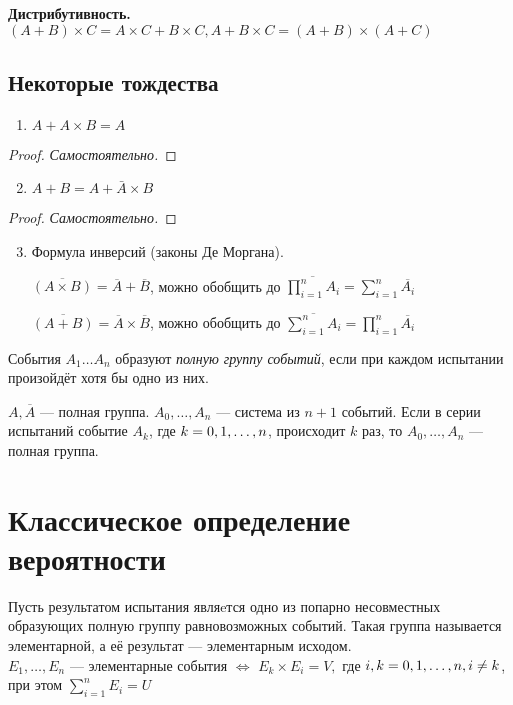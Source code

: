 \textbf{Дистрибутивность.} $(A + B)\times C = A\times C + B\times C,  A + B\times C = (A + B)\times (A + C)$

\subsection{Некоторые тождества}
\begin{enumerate}
	\item $A + A\times B = A$
\end{enumerate}
\begin{proof}
	\textit{Самостоятельно.}
\end{proof}

\begin{enumerate}
	\setcounter{enumi}{1}
	\item{$A + B = A + \bar{A}\times B$}
\end{enumerate}
\begin{proof}
	\textit{Самостоятельно.}
\end{proof}

\begin{enumerate}
	\setcounter{enumi}{2}
	\item Формула инверсий (законы Де Моргана).
	      \smallskip

	      $\overline{(A\times B)} = \overline{A} + \overline{B}$, можно обобщить до $\overline{\prod\limits_{i=1}^n A_i} = \sum\limits_{i=1}^n \overline{A_i} $

	      $\overline{(A + B)} = \overline{A}\times \overline{B}$, можно обобщить до $\overline{\sum\limits_{i=1}^n A_i} = \prod\limits_{i=1}^n \overline{A_i} $
\end{enumerate}
События $A_1 \dots A_n$ образуют \textit{полную группу событий}, если при каждом испытании произойдёт хотя бы одно из них.
\smallskip

\example $A, \overline{A}$ --- полная группа.
\example $A_0, \ldots, A_n$ --- система из $n+1$ событий. Если в серии испытаний событие $A_k$, где $k = 0,1,\dots,n$, происходит $k$ раз, то $A_0, \ldots, A_n$ --- полная группа.

\section{Классическое определение вероятности}
Пусть результатом испытания являeтся одно из попарно несовместных образующих полную группу равновозможных событий. Такая группа называется элементарной, а её результат --- элементарным исходом. \\
$E_1, \dots, E_n$ --- элементарные события $\Leftrightarrow$ $E_k\times E_i = V,$ где $i, k = 0,1,\dots,n, i \not= k$, при этом $\sum\limits_{i = 1}^n E_i = U$

